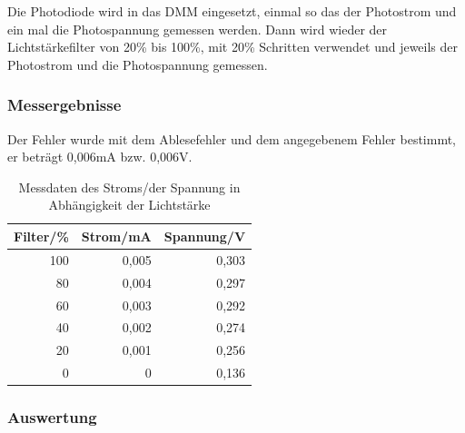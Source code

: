 \documentclass[12pt,a4paper]{article}
\begin{document}
Die Photodiode wird in das DMM eingesetzt, einmal so das der Photostrom und ein mal die Photospannung gemessen werden. Dann wird wieder der Lichtstärkefilter von 20\% bis 100\%, mit 20\% Schritten verwendet und jeweils der Photostrom und die Photospannung gemessen.

\subsubsection*{Messergebnisse}

Der Fehler wurde mit dem Ablesefehler und dem angegebenem Fehler bestimmt, er beträgt 0,006mA bzw. 0,006V.

\begin{table}[H]
\centering
\begin{tabular}{|r|r|r|}
\hline
\multicolumn{1}{|l|}{Filter/\%} & \multicolumn{1}{l|}{Strom/mA} & \multicolumn{1}{l|}{Spannung/V} \\ \hline
100 & 0,005 & 0,303 \\ \hline
80 & 0,004 & 0,297 \\ \hline
60 & 0,003 & 0,292 \\ \hline
40 & 0,002 & 0,274 \\ \hline
20 & 0,001 & 0,256 \\ \hline
0 & 0 & 0,136 \\ \hline
\end{tabular}
\caption{Messdaten des Stroms/der Spannung in Abhängigkeit der Lichtstärke}
\label{tab:1_3}
\end{table}



\subsubsection*{Auswertung}
\end{document}
